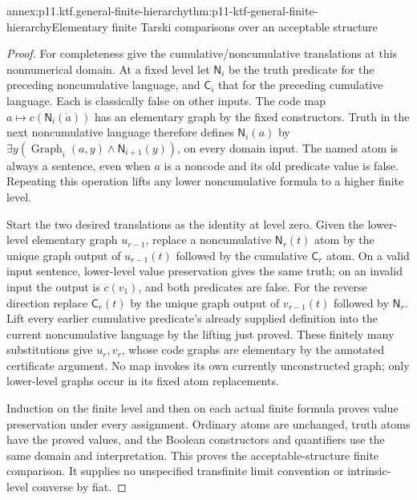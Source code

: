 \begin{annexitem}{annex:p11.ktf.general-finite-hierarchy}{thm:p11-ktf-general-finite-hierarchy}{Elementary finite Tarski comparisons over an acceptable structure}
\begin{proof}
For completeness give the cumulative/noncumulative translations at
this nonnumerical domain. At a fixed level let \(\mathsf N_i\)
be the truth predicate for the preceding noncumulative language,
and \(\mathsf C_i\) that for the preceding cumulative language.
Each is classically false on other inputs. The code map
\(a\mapsto c(\mathsf N_i(\dot a))\) has an elementary
graph by the fixed constructors. Truth in the next noncumulative
language therefore defines \(\mathsf N_i(a)\) by
\(\exists y(\operatorname{Graph}_{i}(a,y)\land
\mathsf N_{i+1}(y))\), on every domain input. The named
atom is always a sentence, even when \(a\) is a noncode
and its old predicate value is false. Repeating this operation
lifts any lower noncumulative formula to a higher finite level.

Start the two desired translations as the identity at level zero.
Given the lower-level elementary graph \(u_{r-1}\), replace
a noncumulative \(\mathsf N_r(t)\) atom by the unique
graph output of \(u_{r-1}(t)\) followed by the cumulative
\(\mathsf C_r\) atom. On a valid input sentence, lower-level
value preservation gives the same truth; on an invalid input the
output is \(c(v_1)\), and both predicates are false. For
the reverse direction replace \(\mathsf C_r(t)\) by the
unique graph output of \(v_{r-1}(t)\) followed by
\(\mathsf N_r\). Lift every earlier cumulative predicate's
already supplied definition into the current noncumulative language
by the lifting just proved. These finitely many substitutions give
\(u_r,v_r\), whose code graphs are elementary by the annotated
certificate argument. No map invokes its own currently unconstructed
graph; only lower-level graphs occur in its fixed atom replacements.

Induction on the finite level and then on each actual finite formula
proves value preservation under every assignment. Ordinary atoms
are unchanged, truth atoms have the proved values, and the Boolean
constructors and quantifiers use the same domain and interpretation.
This proves the acceptable-structure finite comparison. It supplies
no unspecified transfinite limit convention or intrinsic-level
converse by fiat.
\end{proof}
\end{annexitem}

